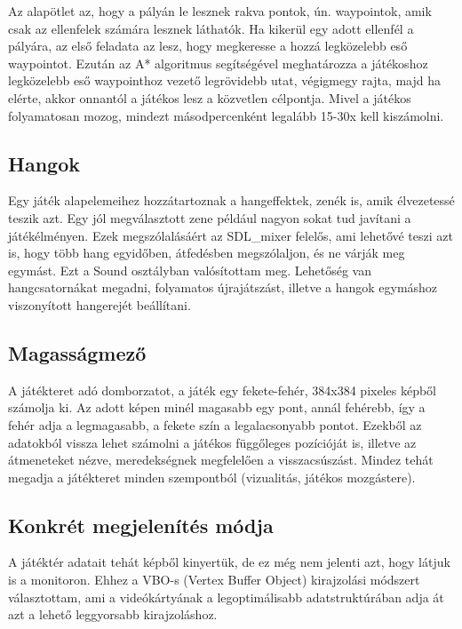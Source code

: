 Az alapötlet az, hogy a pályán le lesznek rakva pontok, ún. waypointok, amik csak az ellenfelek számára lesznek láthatók. Ha kikerül egy adott ellenfél a pályára, az első feladata az lesz, hogy megkeresse a hozzá legközelebb eső waypointot. Ezután az A* algoritmus segítségével meghatározza a játékoshoz legközelebb eső waypointhoz vezető legrövidebb utat, végigmegy rajta, majd ha elérte, akkor onnantól a játékos lesz a közvetlen célpontja. Mivel a játékos folyamatosan mozog, mindezt másodpercenként legalább 15-30x kell kiszámolni.

\subsection{Hangok}

Egy játék alapelemeihez hozzátartoznak a hangeffektek, zenék is, amik élvezetessé teszik azt. Egy jól megválasztott zene például nagyon sokat tud javítani a játékélményen. Ezek megszólalásáért az SDL\_mixer felelős, ami lehetővé teszi azt is, hogy több hang egyidőben, átfedésben megszólaljon, és ne várják meg egymást. Ezt a Sound osztályban valósítottam meg. Lehetőség van hangcsatornákat megadni, folyamatos újrajátszást, illetve a hangok egymáshoz viszonyított hangerejét beállítani.

\subsection{Magasságmező}

A játékteret adó domborzatot, a játék egy fekete-fehér, 384x384 pixeles képből számolja ki. Az adott képen minél magasabb egy pont, annál fehérebb, így a fehér adja a legmagasabb, a fekete szín a legalacsonyabb pontot. Ezekből az adatokból vissza lehet számolni a játékos függőleges pozícióját is, illetve az átmeneteket nézve, meredekségnek megfelelően a visszacsúszást. Mindez tehát megadja a játékteret minden szempontból (vizualitás, játékos mozgástere).

\subsection{Konkrét megjelenítés módja}

A játéktér adatait tehát képből kinyertük, de ez még nem jelenti azt, hogy látjuk is a monitoron. Ehhez a VBO-s (Vertex Buffer Object) kirajzolási módszert választottam, ami a videókártyának a legoptimálisabb adatstruktúrában adja át azt a lehető leggyorsabb kirajzoláshoz.

